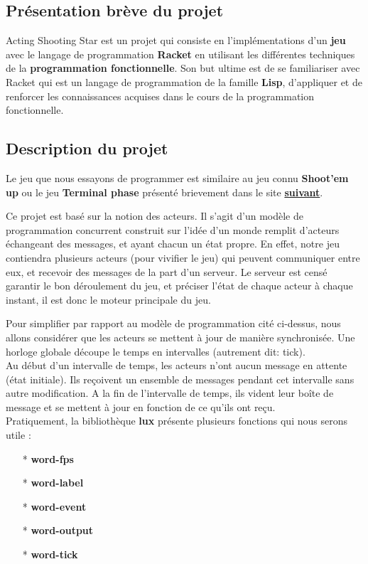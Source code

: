 \documentclass[a4paper]{article}
\begin{document}
\subsection{Présentation brève du projet}
Acting Shooting Star est un projet qui consiste en l'implémentations d'un \textbf{jeu} avec le langage de programmation \textbf{Racket} en utilisant les différentes techniques de la \textbf{programmation fonctionnelle}. Son but ultime est de se familiariser avec Racket qui est un langage de programmation de la famille \textbf{Lisp}, d'appliquer et de renforcer les connaissances acquises dans le cours de la programmation fonctionnelle.

\subsection{Description du projet}\label{description}
Le jeu que nous essayons de programmer est similaire au jeu connu \textbf{Shoot'em up} ou le jeu \textbf{Terminal phase} présenté brievement dans le site \href{https://dustycloud.org/blog/terminal-phase-prototype/}{\textbf{suivant}}.

Ce projet est basé sur la notion des acteurs. Il s'agit d'un modèle de programmation concurrent construit sur l'idée d'un monde remplit d'acteurs échangeant des messages, et ayant chacun un état propre. En effet, notre jeu contiendra plusieurs acteurs (pour vivifier le jeu) qui peuvent communiquer entre eux, et recevoir des messages de la part d'un serveur. Le serveur est censé garantir le bon déroulement du jeu, et préciser l'état de chaque acteur à chaque instant, il est donc le moteur principale du jeu.

Pour simplifier par rapport au modèle de programmation cité ci-dessus, nous allons considérer que les acteurs se mettent à jour de manière synchronisée. Une horloge globale découpe le temps en intervalles (autrement dit: tick).\\ Au début d'un intervalle de temps, les acteurs n'ont aucun message en attente (état initiale). Ils reçoivent un ensemble de messages pendant cet intervalle sans autre modification. A la fin de l'intervalle de temps, ils vident leur boîte de message et se mettent à jour en fonction de ce qu'ils ont reçu.\\
Pratiquement, la bibliothèque \textbf{lux} présente plusieurs fonctions qui nous serons utile :
\begin{itemize}
    \item[*] \textbf{word-fps}
    \item[*] \textbf{word-label}
    \item[*] \textbf{word-event}
    \item[*] \textbf{word-output}
    \item[*] \textbf{word-tick}
\end{itemize}
\end{document}
